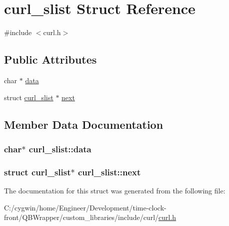 \hypertarget{structcurl__slist}{}\section{curl\+\_\+slist Struct Reference}
\label{structcurl__slist}


{\ttfamily \#include $<$curl.\+h$>$}

\subsection*{Public Attributes}
\begin{DoxyCompactItemize}
\item 
char $\ast$ \hyperlink{structcurl__slist_a5fe4d926491a1c9b8b9a73c40505f601}{data}
\item 
struct \hyperlink{structcurl__slist}{curl\+\_\+slist} $\ast$ \hyperlink{structcurl__slist_a56fcfc41d89a47865933c310d316a108}{next}
\end{DoxyCompactItemize}


\subsection{Member Data Documentation}
\hypertarget{structcurl__slist_a5fe4d926491a1c9b8b9a73c40505f601}{}
\subsubsection[{data}]{\setlength{\rightskip}{0pt plus 5cm}char$\ast$ curl\+\_\+slist\+::data}\label{structcurl__slist_a5fe4d926491a1c9b8b9a73c40505f601}
\hypertarget{structcurl__slist_a56fcfc41d89a47865933c310d316a108}{}
\subsubsection[{next}]{\setlength{\rightskip}{0pt plus 5cm}struct {\bf curl\+\_\+slist}$\ast$ curl\+\_\+slist\+::next}\label{structcurl__slist_a56fcfc41d89a47865933c310d316a108}


The documentation for this struct was generated from the following file\+:\begin{DoxyCompactItemize}
\item 
C\+:/cygwin/home/\+Engineer/\+Development/time-\/clock-\/front/\+Q\+B\+Wrapper/custom\+\_\+libraries/include/curl/\hyperlink{curl_8h}{curl.\+h}\end{DoxyCompactItemize}
